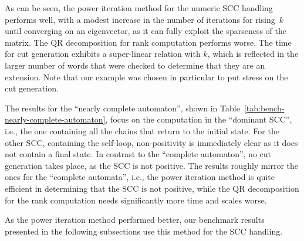 \documentclass{elsarticle}
\begin{document}
As can be seen, the power iteration method for the numeric SCC
handling performs well, with a modest increase in the number of
iterations for rising~$k$ until converging on an
eigenvector, as it can fully exploit the sparseness of the matrix.
The QR decomposition for rank computation
performs worse. The time for cut generation exhibits a super-linear
relation with $k$, which is reflected in the larger number of words
that were checked to determine that they are an extension. Note that
our example was chosen in particular to put stress on the cut
generation.

The results for the ``nearly complete automaton'', shown in
Table~\ref{tab:bench-nearly-complete-automaton}, focus on the
computation in the ``dominant SCC'', i.e., the one containing all the
chains that return to the initial state. For the other SCC,
containing the self-loop, non-positivity is immediately clear as it
does not contain a final state. In contrast to the ``complete
automaton'', no cut generation takes place, as the SCC is not
positive. The results roughly mirror the ones for the ``complete
automata'', i.e., the power iteration method is quite efficient in
determining that the SCC is not positive, while the QR decomposition
for the rank computation needs significantly more time and scales
worse.

As the power iteration method performed better, our benchmark results
presented in the following subsections use this method for the SCC handling.
\end{document}
